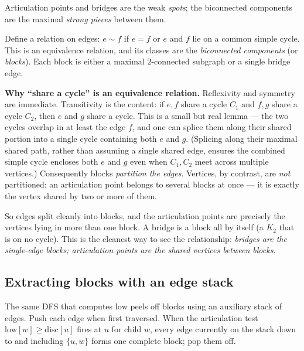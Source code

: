 Articulation points and bridges are the weak \emph{spots}; the biconnected components
are the maximal \emph{strong pieces} between them.

\begin{definition}
\label{ch10:def-block}
Define a relation on edges: $e\sim f$ if $e=f$ or $e$ and $f$ lie on a common simple
cycle. This is an equivalence relation, and its classes are the \emph{biconnected
components} (or \emph{blocks}). Each block is either a maximal $2$-connected subgraph
or a single bridge edge.
\end{definition}

\begin{whybox}
\textbf{Why ``share a cycle'' is an equivalence relation.} Reflexivity and symmetry are
immediate. Transitivity is the content: if $e,f$ share a cycle $C_1$ and $f,g$ share a
cycle $C_2$, then $e$ and $g$ share a cycle. This is a small but real lemma --- the two
cycles overlap in at least the edge $f$, and one can splice them along their shared
portion into a single cycle containing both $e$ and $g$. (Splicing along their maximal shared path, rather than assuming a single shared edge,
ensures the combined simple cycle encloses both $e$ and $g$ even when $C_1,C_2$ meet
across multiple vertices.) Consequently blocks \emph{partition the edges}. Vertices, by contrast, are
\emph{not} partitioned: an articulation point belongs to several blocks at once --- it
is exactly the vertex shared by two or more of them.
\end{whybox}

So edges split cleanly into blocks, and the articulation points are precisely the
vertices lying in more than one block. A bridge is a block all by itself (a $K_2$ that
is on no cycle). This is the cleanest way to see the relationship: \emph{bridges are the
single-edge blocks; articulation points are the shared vertices between blocks}.

\subsection{Extracting blocks with an edge stack}
\label{ch10:bccstack}

The same DFS that computes $\mathrm{low}$ peels off blocks using an auxiliary stack of
edges. Push each edge when first traversed. When the articulation test
$\mathrm{low}[w]\ge\mathrm{disc}[u]$ fires at $u$ for child $w$, every edge currently on
the stack down to and including $\{u,w\}$ forms one complete block; pop them off.

